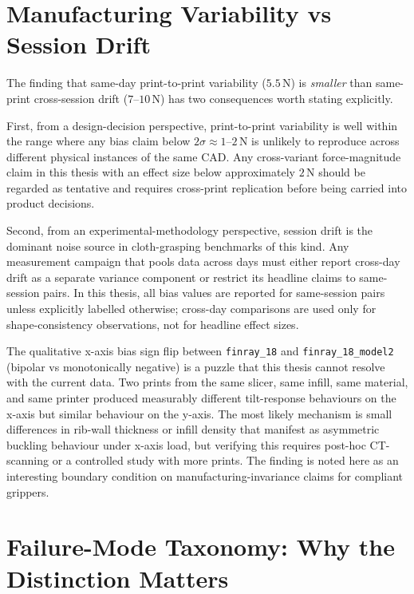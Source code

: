 \section{Manufacturing Variability vs Session Drift}
\label{sec:manufacturing-mechanism}

The finding that same-day print-to-print variability ($5.5$\,N) is
\emph{smaller} than same-print cross-session drift ($7$--$10$\,N) has
two consequences worth stating explicitly.

First, from a design-decision perspective, print-to-print variability
is well within the range where any bias claim below $2 \sigma \approx
1$--$2$\,N is unlikely to reproduce across different physical instances
of the same CAD. Any cross-variant force-magnitude claim in this
thesis with an effect size below approximately $2$\,N should be
regarded as tentative and requires cross-print replication before
being carried into product decisions.

Second, from an experimental-methodology perspective, session drift is
the dominant noise source in cloth-grasping benchmarks of this kind.
Any measurement campaign that pools data across days must either
report cross-day drift as a separate variance component or restrict
its headline claims to same-session pairs. In this thesis, all bias
values are reported for same-session pairs unless explicitly labelled
otherwise; cross-day comparisons are used only for shape-consistency
observations, not for headline effect sizes.

The qualitative x-axis bias sign flip between \texttt{finray\_18} and
\texttt{finray\_18\_model2} (bipolar vs monotonically negative) is a
puzzle that this thesis cannot resolve with the current data. Two
prints from the same slicer, same infill, same material, and same
printer produced measurably different tilt-response behaviours on the
x-axis but similar behaviour on the y-axis. The most likely mechanism
is small differences in rib-wall thickness or infill density that
manifest as asymmetric buckling behaviour under x-axis load, but
verifying this requires post-hoc CT-scanning or a controlled study
with more prints. The finding is noted here as an interesting boundary
condition on manufacturing-invariance claims for compliant grippers.

\section{Failure-Mode Taxonomy: Why the Distinction Matters}
\label{sec:failure-mode-discussion}

